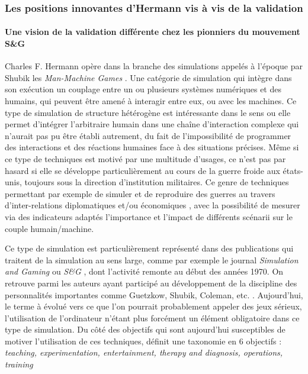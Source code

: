 
\subsubsection{Les positions innovantes d'Hermann vis à vis de la validation}
\label{sssec:position_hermann}

\paragraph{Une vision de la validation différente chez les pionniers du mouvement S\&G}

Charles F. Hermann opère dans la branche des simulations appelés à l'époque par Shubik les \textit{Man-Machine Games} \autocite{Shubik1972}. Une catégorie de simulation qui intègre dans son exécution un couplage entre un ou plusieurs systèmes numériques et des humains, qui peuvent être amené à interagir entre eux, ou avec les machines. Ce type de simulation de structure hétérogène est intéressante dans le sens ou elle permet d'intégrer l'arbitraire humain dans une chaîne d'interaction complexe qui n'aurait pas pu être établi autrement, du fait de l'impossibilité de programmer des interactions et des réactions humaines face à des situations précises. Même si ce type de techniques est motivé par une multitude d'usages, ce n'est pas par hasard si elle se développe particulièrement au cours de la guerre froide aux états-unis, toujours sous la direction d'institution militaires. Ce genre de techniques permettant par exemple de simuler et de reproduire des guerres au travers d'inter-relations diplomatiques et/ou économiques \autocite{Hermann1967b}, avec la possibilité de mesurer via des indicateurs adaptés l'importance et l'impact de différents scénarii sur le couple humain/machine.

Ce type de simulation est particulièrement représenté dans des publications qui traitent de la simulation au sens large, comme par exemple le journal \textit{Simulation and Gaming} ou \textit{S\&G} \autocite{Crookall2011}, dont l'activité remonte au début des années 1970. On retrouve parmi les auteurs ayant participé au développement de la discipline des personnalités importantes comme Guetzkow, Shubik, Coleman, etc. \autocite{Crookall2012}. Aujourd'hui, le terme à évolué vers ce que l'on pourrait probablement appeler des jeux sérieux, l'utilisation de l'ordinateur n'étant plus forcément un élément obligatoire dans ce type de simulation. Du côté des objectifs qui sont aujourd'hui susceptibles de motiver l'utilisation de ces techniques, \textcite{Shubik2009} définit une taxonomie en 6 objectifs : \textit{teaching, experimentation, entertainment, therapy and diagnosis, operations, training }

